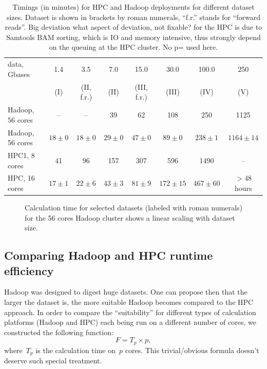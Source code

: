 \documentclass[11pt, oneside]{article}   	%
\newcommand{\COMMENT}[1]{{\color{red} #1 }}
\begin{document}
\begin{table}[tdp]
\small

\caption{Timings  (in minutes) for HPC and  Hadoop deployments for different dataset sizes.    Dataset is shown in brackets by roman numerals, ``f.r.'' stands for ``forward reads''. Big deviation \COMMENT{what aspect of deviation, not fixable?} for the HPC is due to Samtools BAM sorting, which is IO and memory intensive, thus strongly depend on the queuing at the HPC cluster. \COMMENT{No p= used here.} }
\begin{center}
\begin{tabular}{l|c|c|c|c|c|c|c}

data, Gbases		&	1.4	&	3.5		&	7.0		&	15.0		&	30.0		&	100.0	&	250 	\\
				&	(I)	&	(II, f.r.)	&	(II)		&	(III, f.r.)	&	(III)		&	(IV)		&	(V)\\
\hline
Hadoop, 56 cores&--&	--	&39		&62	&108	&250&1125\\
Hadoop, 56 cores		&	$18\pm0	$	&	$18\pm0	$	&	$29\pm0$	&	$47\pm0	$	&	$89\pm0$	&	$238\pm1$		&	$1164\pm14$\\
HPC1, 8 cores&	41&	96	&157	&307	&596	&1490&--\\
HPC, 16 cores	&	$17\pm1$	&	$22\pm6$	&	$43\pm3$	&	$81\pm9$	&	$172\pm15$		&	$467\pm60$	& $>48$ hours\\

\end{tabular}
\end{center}
\label{table:4}
\normalsize
\end{table}%

\begin{figure}[tb]
	
	\caption{Calculation time for selected datasets (labeled with roman numerals) for the 56 cores Hadoop cluster shows a linear scaling with dataset size. }
	\label{fig:fig1}
\end{figure}





\subsection{Comparing Hadoop and HPC runtime efficiency}
Hadoop was designed to digest huge datasets\cite{hadoop,lin2010}. One can propose then that the larger the dataset is, the more suitable Hadoop becomes compared to the HPC approach. In order to compare the ``suitability'' for different types of calculation platforms (Hadoop and HPC) each being run on a different number of cores, we constructed the following function:
$$F=T_{p}\times p,$$ 
where~$T_{p}$ is the calculation time on~$p$ cores. \COMMENT{This trivial/obvious formula doesn't deserve such special treatment.}
\end{document}
